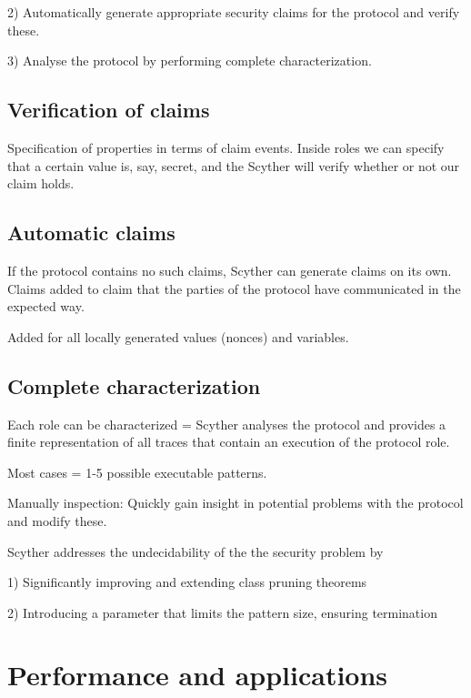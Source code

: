 \documentclass[10pt]{article}
\begin{document}
2) Automatically generate appropriate security claims for the protocol and verify these.

3) Analyse the protocol by performing complete characterization.


\subsection{Verification of claims}

Specification of properties in terms of claim events. Inside roles we can specify that a certain value is, say, secret, and the Scyther will verify whether or not our claim holds.

\subsection{Automatic claims}

If the protocol contains no such claims, Scyther can generate claims on its own. 
Claims added to claim that the parties of the protocol have communicated in the expected way.

Added for all locally generated values (nonces) and variables.


\subsection{Complete characterization}

Each role can be characterized = Scyther analyses the protocol and provides a finite representation of all traces that contain an execution of the protocol role.

Most cases = 1-5 possible executable patterns.

Manually inspection: Quickly gain insight in potential problems with the protocol and modify these.

Scyther addresses the undecidability of the the security problem by

1) Significantly improving and extending class pruning theorems

2) Introducing a parameter that limits the pattern size, ensuring termination


\section{Performance and applications}
\end{document}

